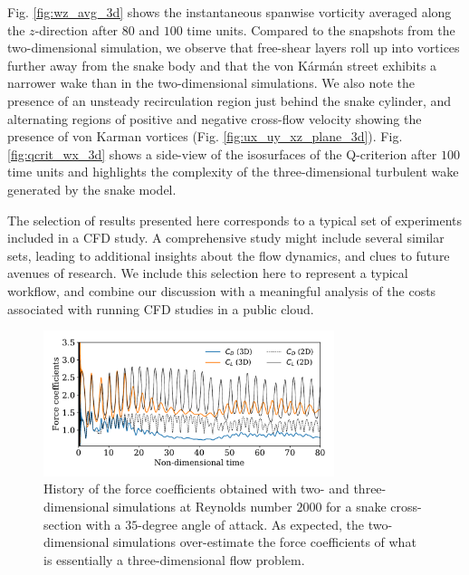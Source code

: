 \documentclass[10pt,journal,compsoc]{IEEEtran}
\begin{document}
Fig. \ref{fig:wz_avg_3d} shows the instantaneous spanwise vorticity averaged along the $z$-direction after $80$ and $100$ time units.
Compared to the snapshots from the two-dimensional simulation, we observe that free-shear layers roll up into vortices further away from the snake body and that the von K\'{a}rm\'{a}n street exhibits a narrower wake than in the two-dimensional simulations.
We also note the presence of an unsteady recirculation region just behind the snake cylinder, and alternating regions of positive and negative cross-flow velocity showing the presence of von Karman vortices (Fig. \ref{fig:ux_uy_xz_plane_3d}).
Fig. \ref{fig:qcrit_wx_3d} shows a side-view of the isosurfaces of the Q-criterion after $100$ time units and highlights the complexity of the three-dimensional turbulent wake generated by the snake model.

The selection of results presented here corresponds to a typical set of experiments included in a CFD study. 
A comprehensive study might include several similar sets, leading to additional insights about the flow dynamics, and clues to future avenues of research.
We include this selection here to represent a typical workflow, and combine our discussion with a meaningful analysis of the costs associated with running CFD studies in a public cloud.

\begin{figure}
    \centering
    \includegraphics[width=8.5cm]{forceCoefficientsCompare2D.pdf}
    \caption{History of the force coefficients obtained with two- and three-dimensional simulations at Reynolds number $2000$ for a snake cross-section with a $35$-degree angle of attack. As expected, the two-dimensional simulations over-estimate the force coefficients of what is essentially a three-dimensional flow problem.}
    \label{fig:force_coefficients}
\end{figure}
\end{document}
